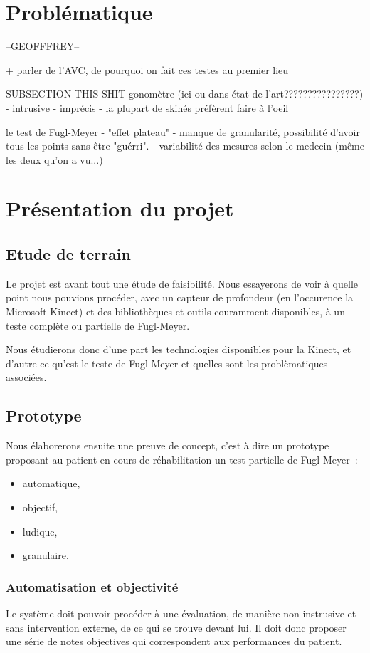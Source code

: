 \documentclass{report}
\begin{document}
		\section{Problématique} --GEOFFFREY--
		
		
		+ parler de l'AVC, de pourquoi on fait ces testes au premier lieu
		
		
		
		
		SUBSECTION THIS SHIT
		gonomètre (ici ou dans état de l'art????????????????)
		- intrusive
		- imprécis
		- la plupart de skinés préfèrent faire à l'oeil
		
		le test de Fugl-Meyer
		- "effet plateau" - manque de granularité, possibilité d'avoir tous les points sans être "guérri".
		- variabilité des mesures selon le medecin (même les deux qu'on a vu...)
		
	\newpage
		\section{Présentation du projet}
		
		\subsection{Etude de terrain}
		Le projet est avant tout une étude de faisibilité. Nous essayerons de voir
		à quelle point nous pouvions procéder, avec un capteur de profondeur (en
		l'occurence la Microsoft Kinect) et des bibliothèques et outils couramment 
		disponibles, à un teste complète ou partielle de Fugl-Meyer.
		
		Nous étudierons donc d'une part les technologies disponibles pour la Kinect,
		et d'autre ce qu'est le teste de Fugl-Meyer et quelles sont les 
		problèmatiques associées.
		
		\subsection{Prototype}
		Nous élaborerons ensuite une preuve de concept, c'est à dire un 
		prototype proposant au patient en cours de réhabilitation un test partielle 
		de Fugl-Meyer~:
		\begin{itemize}
		\item automatique,
		\item objectif, 
		\item ludique,
		\item granulaire.
		\end{itemize}
		
		\subsubsection{Automatisation et objectivité}
		Le système doit pouvoir procéder à une évaluation, de manière non-instrusive 
		et sans intervention externe, de ce qui se trouve devant lui. Il doit donc 
		proposer une série de notes objectives qui correspondent aux performances du 
		patient.
	
\end{document}
